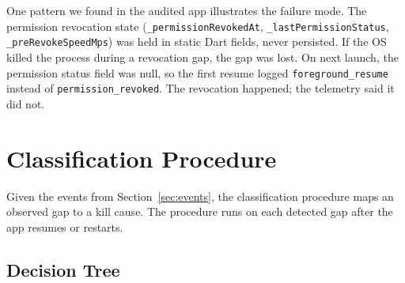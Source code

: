 \documentclass[10pt,journal,compsoc]{IEEEtran}
\begin{document}
One pattern we found in the audited app illustrates the failure mode.
The permission revocation state (\texttt{\_permissionRevokedAt},
\texttt{\_lastPermissionStatus}, \texttt{\_preRevokeSpeedMps}) was held
in static Dart fields, never persisted. If the OS killed the process
during a revocation gap, the gap was lost. On next launch, the
permission status field was null, so the first resume logged
\texttt{foreground\_resume} instead of \texttt{permission\_revoked}. The
revocation happened; the telemetry said it did not.


\section{Classification Procedure}
\label{sec:classification}

Given the events from Section~\ref{sec:events}, the classification
procedure maps an observed gap to a kill cause. The procedure runs on
each detected gap after the app resumes or restarts.

\subsection{Decision Tree}
\end{document}
